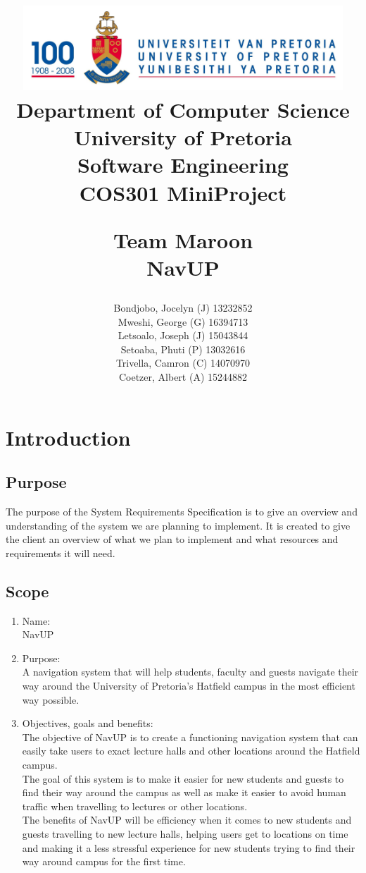 \documentclass[a4paper,10pt]{article}
\title{\includegraphics[width=12cm]{Eeufeeslogo.jpg} \\
       Department of Computer Science \\
       University of Pretoria \\
       \vspace{0.5cm}
       Software Engineering\\
       COS301 MiniProject \\
       \vspace{0.5cm}
       \begin{large} \textbf{Team Maroon}\\ NavUP\end{large}}
\date{}
\author{Bondjobo, Jocelyn (J) 	13232852 		\\
		Mweshi, George (G)		16394713		\\
		Letsoalo, Joseph (J)	15043844		\\
		Setoaba, Phuti (P)		13032616		\\
		Trivella, Camron (C)	14070970		\\
		Coetzer, Albert (A)		15244882		\\
}
\begin{document}
\maketitle
\thispagestyle{empty}
\clearpage

\newpage
{}
\thispagestyle{empty}
\tableofcontents
\clearpage

\newpage
{}

\section{Introduction}

	\subsection{Purpose} 	
		The purpose of the System Requirements Specification is to give an overview and understanding of the system we are planning to implement. It is created to give the client an overview of what we plan to implement and what resources and requirements it will need. 
	\subsection{Scope} 
	\begin{enumerate}
	\item Name: \\ 
	NavUP
	
	\item Purpose: \\
	A navigation system that will help students, faculty and guests navigate their way around the University of Pretoria's Hatfield campus in the most efficient way possible.
	
	\item Objectives, goals and benefits: \\
	The objective of NavUP is to create a functioning navigation system that can easily take users to exact lecture halls and other locations around the Hatfield campus.\\ The goal of this system is to make it easier for new students and guests to find their way around the campus as well as make it easier to avoid human traffic when travelling to lectures or other locations.\\ The benefits of NavUP will be efficiency when it comes to new students and guests travelling to new lecture halls, helping users get to locations on time and making it a less stressful experience for new students trying to find their way around campus for the first time.  
	\end{enumerate}
\end{document}
